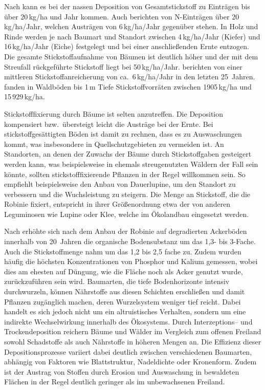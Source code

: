 \documentclass[twocolumn]{scrartcl}
\begin{document}
Nach \citet{uba1998deposition} kann es bei der nassen Deposition von
Gesamtstickstoff zu Einträgen bis über 20\,kg/ha und Jahr kommen. Auch
\citet{raspe2018stickstoff} berichten von N-Einträgen über
20\,kg/ha/Jahr, welchen Austrägen von 6\,kg/ha/Jahr gegenüber
stehen. In Holz und Rinde werden je nach Baumart und Standort zwischen
4\,kg/ha/Jahr (Kiefer) und 16\,kg/ha/Jahr (Eiche) festgelegt und bei
einer anschließenden Ernte entzogen. Die gesamte Stickstoffaufnahme
von Bäumen ist deutlich höher und der mit dem Streufall rückgeführte
Stickstoff liegt bei 50\,kg/ha/Jahr. \citet{raspe2018stickstoff}
berichten von einer mittleren Stickstoffanreicherung von
ca.\ 6\,kg/ha/Jahr in den letzten 25~Jahren.
\citet{emberger1965stickstoff} fanden in Waldböden bis 1\,m Tiefe
Stickstoffvorräten zwischen 1905\,kg/ha und 15\,929\,kg/ha.

Stickstofffixierung durch Bäume ist selten anzutreffen.
Die Deposition kompensiert bzw.\ übersteigt leicht die Austräge bei
der Ernte. Bei stickstoffgesättigten Böden ist damit zu rechnen, dass
es zu Auswaschungen kommt, was insbesondere in Quellschutzgebieten zu
vermeiden ist. An Standorten, an denen der Zuwachs der Bäume durch
Stickstoffgaben gesteigert werden kann, was beispielsweise in ehemals
streugenutzten Wäldern der Fall sein könnte, sollten
stickstofffixierende Pflanzen in der Regel willkommen sein. So
empfiehlt beispielsweise \citet{wiedemann1951ertragskunde} den Anbau
von Dauerlupine, um den Standort zu verbessern und die Wuchsleistung zu
steigern. Die Menge an Stickstoff, die die Robinie fixiert, entspricht
in ihrer Größenordnung etwa der von anderen Leguminosen wie Lupine
oder Klee, welche im Ökolandbau eingesetzt werden.

Nach \citet{papaioannou2016robinieBoden} erhöhte sich nach dem Anbau
der Robinie auf degradierten Ackerböden innerhalb von 20~Jahren die
organische Bodensubstanz um das 1,3- bis 3-Fache. Auch die
Stickstoffmenge nahm um das 1,2 bis 2,5 fache zu. Zudem wurden häufig
die höchsten Konzentrationen von Phosphor und Kalium gemessen, wobei
dies am ehesten auf Düngung, wie die Fläche noch als Acker genutzt
wurde, zurückzuführen sein wird. Baumarten, die tiefe Bodenhorizonte
intensiv durchwurzeln, können Nährstoffe aus diesen Schichten
erschließen und damit Pflanzen zugänglich machen, deren Wurzelsystem
weniger tief reicht. Dabei handelt es sich jedoch nicht um ein
altruistisches Verhalten, sondern um eine indirekte Wechselwirkung
innerhalb des Ökosystems. Durch Interzeptions-- und Trockendeposition
reichern Bäume und Wälder im Vergleich zum offenen Freiland sowohl
Schadstoffe als auch Nährstoffe in höheren Mengen an. Die Effizienz
dieser Depositionsprozesse variiert dabei deutlich zwischen
verschiedenen Baumarten, abhängig von Faktoren wie Blattstruktur,
Nadeldichte oder Kronenform. Zudem ist der Austrag von Stoffen durch
Erosion und Auswaschung in bewaldeten Flächen in der Regel deutlich
geringer als im unbewachsenen Freiland.
\end{document}
